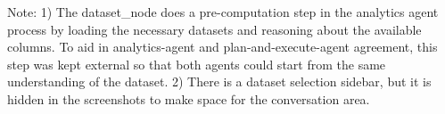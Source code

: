 Note:
1) The dataset\_node does a pre-computation step in the analytics agent process by loading the necessary datasets and reasoning about the available columns. To aid in analytics-agent and plan-and-execute-agent agreement, this step was kept external so that both agents could start from the same understanding of the dataset.
2) There is a dataset selection sidebar, but it is hidden in the screenshots to make space for the conversation area.
